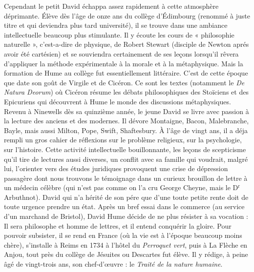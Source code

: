 Cependant le petit David échappa assez rapidement
à cette atmosphère déprimante. Élève dès
l'âge de onze ans du collège d’Édimbourg (renommé
à juste titre et qui deviendra plus tard université),
il se trouve dans une ambiance intellectuelle beaucoup 
plus stimulante. Il y écoute les cours de « philosophie
naturelle », c’est-a-dire de physique, de
Robert Stewart (disciple de Newton aprés avoir été
cartésien) et se souviendra certainement de ses
leçons lorsqu’il rêvera d’appliquer la méthode expérimentale
à la morale et à la métaphysique. Mais
la formation de Hume au collège fut essentiellement
littéraire. C’est de cette époque que date son goût
de Virgile et de Cicéron. Ce sont les textes (notamment
le {\it De Natura Deorum}) où Cicéron résume les
débats philosophiques des Stoïciens et des Epicuriens
qui découvrent à Hume le monde des discussions
métaphysiques. Revenu à Ninewells dès sa quinzième
année, le jeune David se livre avec passion à la
lecture des anciens et des modernes. Il dévore
Montaigne, Bacon, Malebranche, Bayle, mais aussi
Milton, Pope, Swift, Shaftesbury. À l’âge de vingt
ans, il a déja rempli un gros cahier de réflexions sur
le problème religieux, sur la psychologie, sur l’histoire.
Cette activité intellectuelle bouillonnante, les
leçons de scepticisme qu’il tire de lectures aussi
diverses, un conflit avec sa famille qui voudrait,
malgré lui, l'orienter vers des études juridiques
provoquent une crise de dépression passagère dont
nous trouvons le témoignage dans un curieux brouillon
de lettre à un médecin célèbre (qui n’est pas
comme on l’a cru George Cheyne, mais le D$^\text{r}$ Arbuthnot).
David qui n’a hérité de son pére que d’une
toute petite rente doit de toute urgence prendre
un état. Après un bref essai dans le commerce (au
service d’un marchand de Bristol), David Hume
décide de ne plus résister à sa vocation : Il sera
philosophe et homme de lettres, et il entend conquérir
la gloire. Pour pouvoir subsister, il se rend en France
(où la vie est à l’époque beaucoup moins chère),
s’installe à Reims en 1734 à l'hôtel du {\it Perroquet
vert}, puis à La Flèche en Anjou, tout près du collège
de Jésuites ou Descartes fut élève. Il y rédige, à
peine âgé de vingt-trois ans, son chef-d’{\oe}uvre :
le {\it Traité de la nature humaine}.

